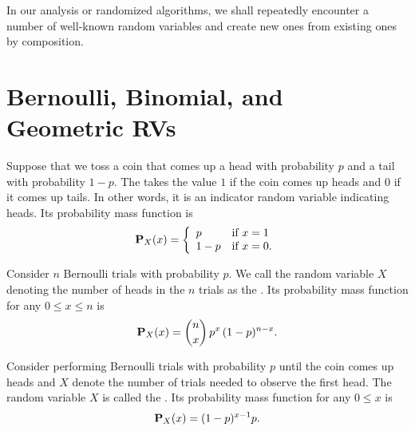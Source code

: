 
In our analysis or randomized algorithms, we shall repeatedly
encounter a number of well-known random variables and create new ones
from existing ones by composition.


\section{Bernoulli, Binomial, and Geometric RVs}
\label{sec:probability::randvar::standards}

\begin{gram}
Suppose that we toss a  coin that comes up a head with probability $p$
and a tail with probability $1-p$.
%
The  takes the value $1$ if the coin
comes up heads and $0$ if it comes up tails.
%
In other words, it is an indicator random variable indicating heads.
%
Its probability mass function is 
\[
\mathbf{P}_{X}(x) = 
\left\{
\begin{array}{ll}
p & \mbox{if}~x = 1
\\
1-p & \mbox{if}~x = 0.
\end{array}
\right.
\]
\end{gram}

\begin{gram}
Consider $n$ Bernoulli trials with probability $p$.  We call the
random variable $X$ denoting the number of heads in the $n$ trials as
the .
%
Its probability mass function for any $0 \le x \le n$ is 
%
\[
\mathbf{P}_{X}(x) = {n \choose x}\,p^x\,(1-p)^{n-x}.
\]
\end{gram}

\begin{gram}
Consider performing Bernoulli trials with probability $p$ until the
coin comes up heads and  $X$ denote the number of trials needed to
observe the first head. 
%
The random variable $X$ is called the .
%
Its probability mass function for any $0 \le x$ is 
%
\[
\mathbf{P}_{X}(x) = (1-p)^{x-1} p.
\]
\end{gram}

